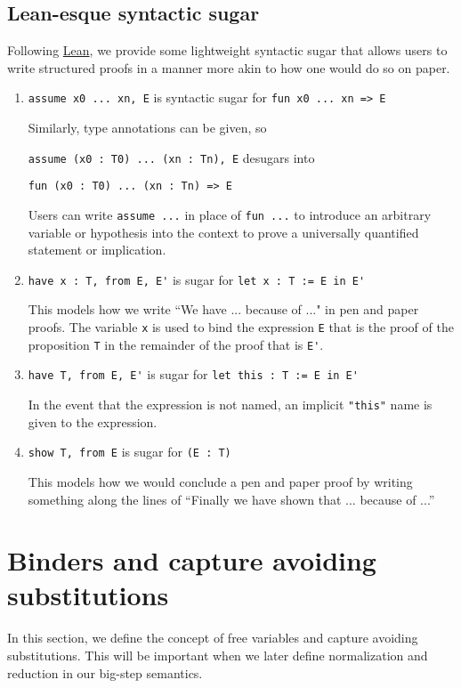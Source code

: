 \documentclass{article}
\begin{document}
\subsection{Lean-esque syntactic sugar}
Following \href{https://leanprover.github.io/reference/expressions.html#structured-proofs}
{Lean}, we provide some lightweight syntactic sugar that allows users to write
structured proofs in a manner more akin to how one would do so on paper.

\begin{enumerate}
  \item \verb|assume x0 ... xn, E| is syntactic sugar for \verb|fun x0 ... xn => E| 

  Similarly, type annotations can be given, so

  \verb|assume (x0 : T0) ... (xn : Tn), E| desugars into 
  
  \verb|fun (x0 : T0) ... (xn : Tn) => E|

  Users can write \verb|assume ...| in place of \verb|fun ...| to introduce an 
  arbitrary variable or hypothesis into the context to prove a universally
  quantified statement or implication.

  \item \verb|have x : T, from E, E'| is sugar for \verb|let x : T := E in E'|

  This models how we write ``We have ... because of ..." in pen and paper proofs.
  The variable \verb|x| is used to bind the expression \verb|E| that is the proof
  of the proposition \verb|T| in the remainder of the proof that is \verb|E'|. 

  \item \verb|have T, from E, E'| is sugar for \verb|let this : T := E in E'|

  In the event that the expression is not named, an implicit \verb|"this"| name is
  given to the expression.

  \item \verb|show T, from E| is sugar for \verb|(E : T)|

  This models how we would conclude a pen and paper proof by writing something
  along the lines of ``Finally we have shown that ... because of ...'' 
\end{enumerate}


\section{Binders and capture avoiding substitutions}
In this section, we define the concept of free variables and capture avoiding
substitutions. 
This will be important when we later define normalization and
reduction in our big-step semantics.
\end{document}

